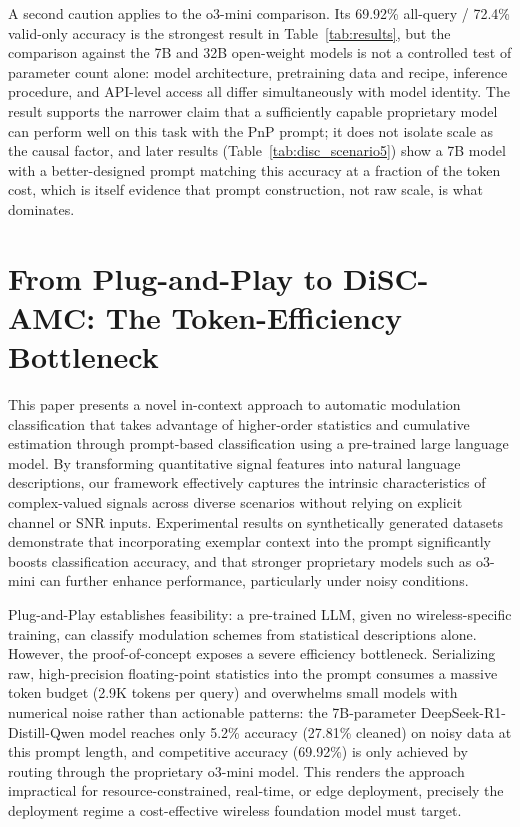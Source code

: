 A second caution applies to the o3-mini comparison. Its 69.92\% all-query / 72.4\% valid-only accuracy is the strongest result in Table~\ref{tab:results}, but the comparison against the 7B and 32B open-weight models is not a controlled test of parameter count alone: model architecture, pretraining data and recipe, inference procedure, and API-level access all differ simultaneously with model identity. The result supports the narrower claim that a sufficiently capable proprietary model can perform well on this task with the PnP prompt; it does not isolate scale as the causal factor, and later results (Table~\ref{tab:disc_scenario5}) show a 7B model with a better-designed prompt matching this accuracy at a fraction of the token cost, which is itself evidence that prompt construction, not raw scale, is what dominates.

\section{From Plug-and-Play to DiSC-AMC: The Token-Efficiency Bottleneck}
\label{sec:pnp_to_disc}

This paper presents a novel in-context approach to automatic modulation classification that takes advantage of higher-order statistics and cumulative estimation through prompt-based classification using a pre-trained large language model. By transforming quantitative signal features into natural language descriptions, our framework effectively captures the intrinsic characteristics of complex-valued signals across diverse scenarios without relying on explicit channel or SNR inputs. Experimental results on synthetically generated datasets demonstrate that incorporating exemplar context into the prompt significantly boosts classification accuracy, and that stronger proprietary models such as o3-mini can further enhance performance, particularly under noisy conditions.

Plug-and-Play establishes feasibility: a pre-trained LLM, given no wireless-specific training, can classify modulation schemes from statistical descriptions alone. However, the proof-of-concept exposes a severe efficiency bottleneck. Serializing raw, high-precision floating-point statistics into the prompt consumes a massive token budget (2.9K tokens per query) and overwhelms small models with numerical noise rather than actionable patterns: the 7B-parameter DeepSeek-R1-Distill-Qwen model reaches only 5.2\% accuracy (27.81\% cleaned) on noisy data at this prompt length, and competitive accuracy (69.92\%) is only achieved by routing through the proprietary o3-mini model. This renders the approach impractical for resource-constrained, real-time, or edge deployment, precisely the deployment regime a cost-effective wireless foundation model must target.

